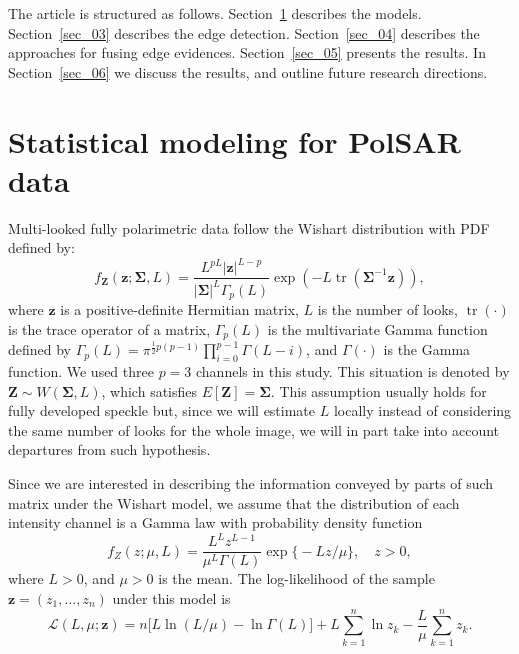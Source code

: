 \documentclass[journal]{IEEEtran}
\DeclareMathOperator{\traco}{tr}
\begin{document}

The article is structured as follows.
Section~\ref{sec_02} describes the models.
Section~\ref{sec_03} describes the edge detection.
Section~\ref{sec_04} describes the approaches for fusing edge evidences.
Section~\ref{sec_05} presents the results.
In Section~\ref{sec_06} we discuss the results, and outline future research directions.

\section{Statistical modeling for PolSAR data}\label{sec_02}

Multi-looked fully polarimetric data follow the Wishart distribution with PDF defined by:
\begin{equation}
    f_{\mathbf{Z}}(\mathbf{z};\mathbf{\Sigma},L)=\frac{L^{pL}|\mathbf{z}|^{L-p}}{|\mathbf{\Sigma}|^{L}\Gamma_p(L)} \exp(-L\traco(\mathbf{\Sigma}^{-1}\mathbf{z})),
    \label{eq:DistWishart}
\end{equation} 
where $\mathbf z$ is a positive-definite Hermitian matrix, 
$L$ is the number of looks, 
$\traco(\cdot)$ is the trace operator of a matrix, $\Gamma_p(L)$ is the multivariate Gamma function defined by $
	\Gamma_p(L)=\pi^{\frac{1}{2}p(p-1)} \prod_{i=0}^{p-1}\Gamma(L-i)$,
and $\Gamma(\cdot)$ is the Gamma function.
We used three $p=3$ channels in this study. 
This situation is denoted by $\mathbf{Z}\sim W(\mathbf{\Sigma}, L)$, which satisfies $E[\mathbf{Z}]=\mathbf{\Sigma}$. 
This assumption usually holds for fully developed speckle but, since we will estimate $L$ locally instead of considering the same number of looks for the whole image, we will in part take into account departures from such hypothesis.

Since we are interested in describing the information conveyed by parts of such matrix under the Wishart model, we assume that the distribution of each intensity channel is a 
Gamma law with probability density function
\begin{equation}
f_Z(z;\mu,L)=\frac{L^{L}z^{L-1}}{\mu^{L}\Gamma(L)} \exp\big\{-Lz/\mu\big\},\quad z>0,
\label{func_dens_uni_gamma}
\end{equation}
where $L>0$, and
$\mu>0$ is the mean.
The log-likelihood of the sample $\bm z = (z_1,\dots,z_n)$ under this model is
\begin{equation}
\mathcal L( L,\mu; \bm z) = 
n \big[L\ln (L / \mu) - \ln \Gamma(L)\big]
+L \sum_{k=1}^{n}\ln z_k -\frac{L}{\mu}\sum_{k=1}^{n} z_k.
\label{eq:LogLikelihoodGamma}
\end{equation}
\end{document}
